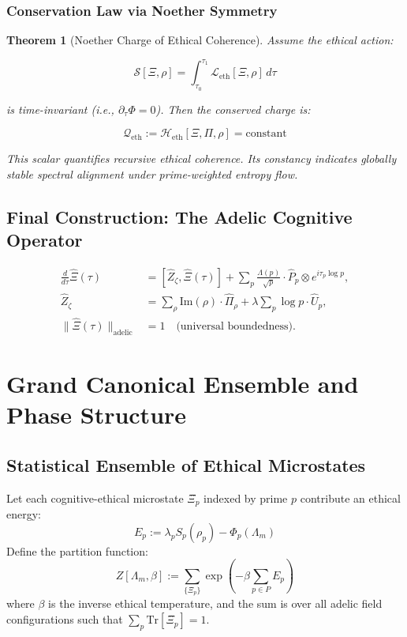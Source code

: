\documentclass{article}
\theoremstyle{plain}
\newtheorem{theorem}{Theorem}
\theoremstyle{claimstyle}
\begin{document}
\subsubsection{Conservation Law via Noether Symmetry}
\begin{theorem}[Noether Charge of Ethical Coherence]
Assume the ethical action:

\[
\mathcal{S}[\Xi, \rho] = \int_{\tau_0}^{\tau_1} \mathcal{L}_{\mathrm{eth}}[\Xi, \rho] \, d\tau
\]

is time-invariant (i.e., $\partial_\tau \Phi = 0$). Then the conserved charge is:

\[
\mathcal{Q}_{\text{eth}} := \mathcal{H}_{\mathrm{eth}}[\Xi, \Pi, \rho] = \text{constant}
\]

This scalar quantifies recursive ethical coherence. Its constancy indicates globally stable spectral alignment under prime-weighted entropy flow.
\end{theorem}



\subsection*{Final Construction: The Adelic Cognitive Operator}

\[
\boxed{
\begin{aligned}
\frac{d}{d\tau} \hat{\Xi}(\tau) &= [\hat{Z}_\zeta, \hat{\Xi}(\tau)] + \sum_p \frac{\Lambda(p)}{\sqrt{p}} \cdot \hat{P}_p \otimes e^{i \tau_p \log p}, \\
\hat{Z}_\zeta &= \sum_{\rho} \text{Im}(\rho) \cdot \hat{\Pi}_\rho + \lambda \sum_{p} \log p \cdot \hat{U}_p, \\
\| \hat{\Xi}(\tau) \|_{\text{adelic}} &= 1 \quad \text{(universal boundedness)}.
\end{aligned}
}
\]



\section{Grand Canonical Ensemble and Phase Structure}
\subsection{Statistical Ensemble of Ethical Microstates}

\begin{definition}
Let each cognitive-ethical microstate $\Xî_p$ indexed by prime $p$ contribute an ethical energy:
\[
E_p := \lambda_p S_p(\rho_p) - \Phi_p(\Lambda_m)
\]
Define the partition function:
\[
Z[\Lambda_m, \beta] := \sum_{\{\Xî_p\}} \exp\left( -\beta \sum_{p \in P} E_p \right)
\]
where $\beta$ is the inverse ethical temperature, and the sum is over all adelic field configurations such that $\sum_p \text{Tr}[\Xî_p] = 1$.
\end{definition}
\end{document}

